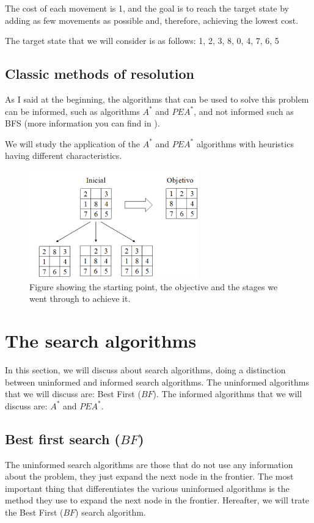 \documentclass[runningheads]{llncs}
\begin{document}
The cost of each movement is 1, and the goal is to reach the target state by adding as few movements as possible 
and, therefore, achieving the lowest cost.

The target state that we will consider is as follows:
{1, 2, 3, 8, 0, 4, 7, 6, 5}

\subsection{Classic methods of resolution}
As I said at the beginning, the algorithms that can be used to solve this problem can be informed, such as algorithms 
$A^*$ and $PEA^*$, and not informed such as BFS (more information you can find in \cite{algorithms_2}).

We will study the application of the $A^*$ and $PEA^*$ algorithms with heuristics having different characteristics.

\begin{figure}
\centering
\includegraphics[width=0.65\textwidth]{8puzzle.png}
\caption{Figure showing the starting point, the objective and the stages we went through to achieve it.} \label{fig1}
\end{figure}

\section{The search algorithms}
In this section, we will discuss about search algorithms, doing a distinction between uninformed and informed search algorithms.
The uninformed algorithms that we will discuss are: Best First (\(BF\)).
The informed algorithms that we will discuss are: $A^*$ and $PEA^*$.

\subsection{Best first search (\(BF\))}
The uninformed search algorithms are those that do not use any information about the problem, they just expand the next node in the frontier.
The most important thing that differentiates the various uninformed algorithms is the method they use to expand the next node in the frontier.
Hereafter, we will trate the Best First (\(BF\)) search algorithm.
\end{document}
